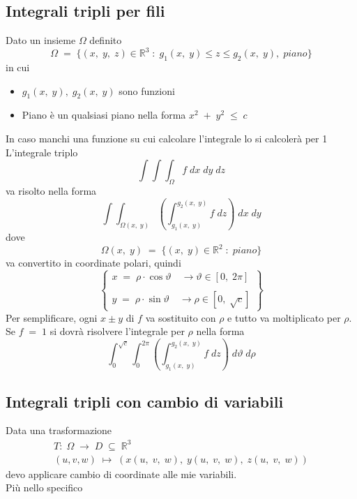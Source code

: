 \documentclass[a4paper, 10pt]{article}
\begin{document}
 			\subsection{Integrali tripli per fili}
 				Dato un insieme $ \Omega $ definito
 					\[
 						\Omega\; =\; \{ (x,\; y,\; z) \in \mathbb{R}^3\; :\; g_1(x,\; y) \leq z \leq g_2(x,\; y),\; piano \}
 					\]
 				in cui
 					\begin{itemize}
 						\item $ g_1(x,\; y),\; g_2(x,\; y) $ sono funzioni
 						\item Piano è un qualsiasi piano nella forma $ x^2\; +\; y^2\; \leq\; c $
  					\end{itemize}
  				In caso manchi una funzione su cui calcolare l'integrale lo si calcolerà per 1\\
  				L'integrale triplo
  					\[
  					\int{\int{\int_{\Omega}{f}}}\; dx\;dy\;dz
  					\]
  				va risolto nella forma
  					\[
	  					\int{\int_{\Omega(x,\; y)}^{ }{\left( \int_{g_1(x,\; y)}^{g_2(x,\; y)}{f}\; dz \right)}}\; dx\; dy
  					\]
  				dove
  					\[
  						\Omega(x,\; y)\; =\; \{ (x,\; y) \in \mathbb{R}^2\; :\; piano \}
  					\]
  				va convertito in coordinate polari, quindi
  					\[
	  					\left\{ 
		  					\begin{array}{l} 
			  					x\; =\; \rho \cdot \cos{\vartheta}\quad \rightarrow \vartheta \in [0,\; 2\pi] \\
			  					\\ 
			  					y\; =\; \rho \cdot \sin{\vartheta}\quad \rightarrow \rho \in [0,\; \sqrt{c}]
		  					\end{array} 
	  					\right\}
  					\]
  				Per semplificare, ogni $ x \pm y $ di $ f $ va sostituito con $ \rho $ e tutto va moltiplicato per $ \rho $.\\
  				Se $ f\; =\; 1 $ si dovrà risolvere l'integrale per $ \rho $ nella forma
  					\[
  						\int_{0}^{\sqrt{c}}{\int_{0}^{2\pi}{\left( \int_{g_1(x,\; y)}^{g_2(x,\; y)}{f}\; dz \right)}}\; d\vartheta\; d\rho
  					\]
  					
  			\subsection{Integrali tripli con cambio di variabili}
  				Data una trasformazione
  					\[
  						\begin{array}{c}
	  						T:\; \Omega\; \rightarrow\; D\; \subseteq\; \mathbb{R}^3 \\
	  						(u, v, w)\; \mapsto\; (x(u,\; v,\; w),\; y(u,\; v,\; w),\; z(u,\; v,\; w))
  						\end{array}	  					
  					\]
  				devo applicare cambio di coordinate alle mie variabili.\\
  				Più nello specifico
  				
\end{document}

